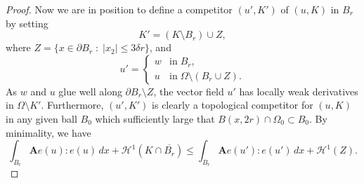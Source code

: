 \documentclass[12pt]{article}
\theoremstyle{definition}
\theoremstyle{remark}
\numberwithin{equation}{section}
\newcommand{\dd}{\partial}
\newcommand{\R}{\mathbb{R}}
\newcommand{\D}{\nabla}
\newcommand{\A}{\mathbf{A}}
\renewcommand{\H}{\mathcal{H}}
\begin{document}
\begin{proof}
    Now we are in position to define a competitor $(u',K')$ of $(u,K)$ in $B_r$ by setting
    \begin{equation}
        K'=(K\setminus B_r)\cup Z,
    \end{equation}
    where $Z = \{x \in \dd B_r \;:\; |x_2|\leq 3 \delta r \}$, and
    \begin{equation}
        u'=
        \begin{cases}
            w & \text{in} \; B_r,\\
            u & \text{in} \; \Omega \setminus (B_r\cup Z).
        \end{cases}
    \end{equation}
    As $w$ and $u$ glue well along $\dd B_r\setminus Z$, the vector field $u'$ has locally weak derivatives in
    $\Omega \setminus K'$. Furthermore, $(u',K')$ is clearly a topological competitor for $(u,K)$ in any given ball $B_0$
    which sufficiently large that $B(x,2r) \cap \Omega_0 \subset B_0$.
    By minimality, we have
    \begin{equation}
        \int_{B_r}\A e(u) : e(u)\,dx+\H^1(K\cap\overline{B_r}) \leq \int_{B_r}\A e(u') : e(u')\,dx+\H^1(Z).

\end{equation}
\end{proof}
\end{document}
